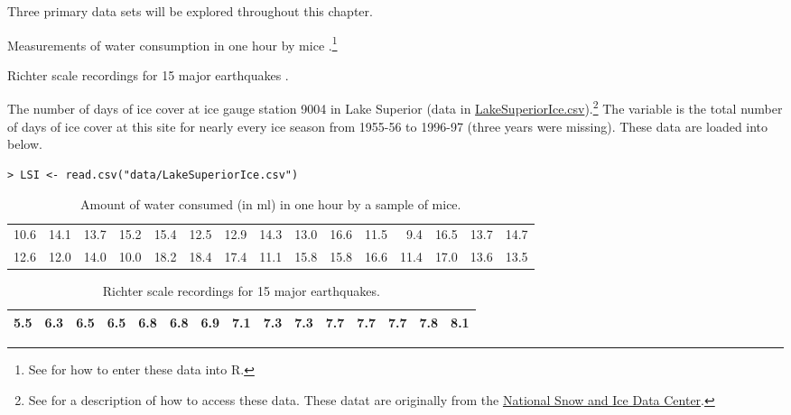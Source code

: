 \documentclass[10pt,openany]{book}\usepackage[]{graphicx}\usepackage[]{color}
\makeatletter
\newenvironment{kframe}{%
 \def\at@end@of@kframe{}%
 \ifinner\ifhmode%
  \def\at@end@of@kframe{\end{minipage}}%
  \begin{minipage}{\columnwidth}%
 \fi\fi%
 \def\FrameCommand##1{\hskip\@totalleftmargin \hskip-\fboxsep
 \colorbox{shadecolor}{##1}\hskip-\fboxsep
     \hskip-\linewidth \hskip-\@totalleftmargin \hskip\columnwidth}%
 \MakeFramed {\advance\hsize-\width
   \@totalleftmargin\z@ \linewidth\hsize
   \@setminipage}}%
 {\par\unskip\endMakeFramed%
 \at@end@of@kframe}
\newenvironment{knitrout}{}{} %
\makeatother
\begin{document}
Three primary data sets will be explored throughout this chapter.

\vspace{-12pt}
\begin{Itemize}
  \item Measurements of water consumption in one hour by mice .\footnote{See  for how to enter these data into R.}
  \item Richter scale recordings for 15 major earthquakes .
  \item The number of days of ice cover at ice gauge station 9004 in Lake Superior (data in \href{https://raw.githubusercontent.com/droglenc/NCData/master/LakeSuperiorIce.csv}{LakeSuperiorIce.csv}).\footnote{See  for a description of how to access these data. These datat are originally from the \href{http://www.nsidc.org/}{National Snow and Ice Data Center}.}  The  variable is the total number of days of ice cover at this site for nearly every ice season from 1955-56 to 1996-97 (three years were missing).  These data are loaded into  below.
\vspace{-6pt}
\begin{knitrout}
\color{fgcolor}\begin{kframe}
\begin{verbatim}
> LSI <- read.csv("data/LakeSuperiorIce.csv")
\end{verbatim}
\end{kframe}
\end{knitrout}
\end{Itemize}

\begin{table}[ht]
\centering
\caption{Amount of water consumed (in ml) in one hour by a sample of mice.} 
\label{tab:MouseData}
\begin{tabular}{rrrrrrrrrrrrrrr}
   \hline
10.6 & 14.1 & 13.7 & 15.2 & 15.4 & 12.5 & 12.9 & 14.3 & 13.0 & 16.6 & 11.5 & 9.4 & 16.5 & 13.7 & 14.7 \\ 
  12.6 & 12.0 & 14.0 & 10.0 & 18.2 & 18.4 & 17.4 & 11.1 & 15.8 & 15.8 & 16.6 & 11.4 & 17.0 & 13.6 & 13.5 \\ 
   \hline
\end{tabular}
\end{table}


\begin{table}[ht]
\centering
\caption{Richter scale recordings for 15 major earthquakes.} 
\label{tab:EQData}
\begin{tabular}{rrrrrrrrrrrrrrr}
   \hline
5.5 & 6.3 & 6.5 & 6.5 & 6.8 & 6.8 & 6.9 & 7.1 & 7.3 & 7.3 & 7.7 & 7.7 & 7.7 & 7.8 & 8.1 \\ 
   \hline
\end{tabular}
\end{table}
\end{document}
